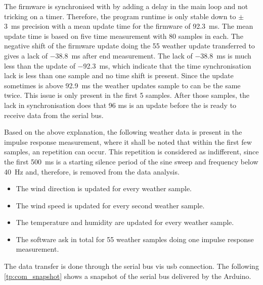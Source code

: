 The firmware is synchronised with \matlab by adding a delay in the main loop and not tricking on a timer. Therefore, the program runtime is only stable down to $\pm$ \SI{3}{\milli\second} precision with a mean update time for the firmware of \SI{92.3}{\milli\second}. The mean update time is based on five time measurement with 80 samples in each. The negative shift of the firmware update doing the 55 weather update transferred to \matlab gives a lack of \SI{-38.8}{\milli\second} after end measurement.  The lack of \SI{-38.8}{\milli\second} is much less than the update of \SI{-92.3}{\milli\second}, which indicate that the time synchronisation lack is less than one sample and no time shift is present. Since the update sometimes is above \SI{92.9}{\milli\second} the weather updates sample to \matlab can be the same twice. This issue is only present in the first 5 samples. After those samples, the lack in synchronisation does that 96 ms is an update before the \matlab is ready to receive data from the serial bus.

Based on the above explanation, the following weather data is present in the impulse response measurement, where it shall be noted that within the first few samples, an repetition can occur. This repetition is considered as indifferent, since the first \SI{500}{\milli\second} is a starting silence period of the sine sweep and frequency below \SI{40}{\hertz} and, therefore, is removed from the data analysis. 

\begin{itemize}
\item The wind direction is updated for every weather sample.  
\item The wind speed is updated for every second weather sample.
\item The temperature and humidity are updated for every weather sample.
\item The \matlab software ask in total for 55 weather samples doing one impulse response measurement. 
\end{itemize}

The data transfer is done through the serial bus vis \gls{usb} connection. The following \autoref{tp:com_snapshot} shows a snapshot of the serial bus delivered by the Arduino.


